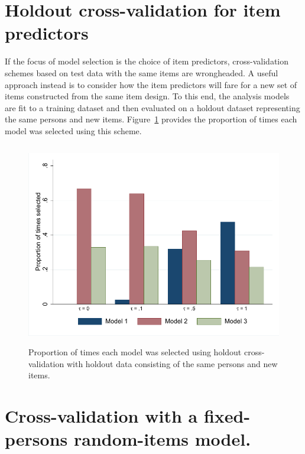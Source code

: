 \documentclass[12pt, letterpaper]{article}
\begin{document}
\section{Holdout cross-validation for item predictors}

If the focus of model selection is the choice of item predictors, cross-validation schemes based on test data with the same items are wrongheaded. A useful approach instead is to consider how the item predictors will fare for a new set of items constructed from the same item design. To this end, the analysis models are fit to a training dataset and then evaluated on a holdout dataset representing the same persons and new items. Figure~\ref{fig:select-newitems} provides the proportion of times each model was selected using this scheme. 

\begin{figure}[tbp]
	\centering
	\includegraphics[height=3.5in, trim = 1mm 1mm 1mm 1mm, clip=true]
		{chapter_2/figs/select_newitems.pdf}
	\caption{Proportion of times each model was selected using holdout cross-validation with holdout data consisting of the same persons and new items.}
	\label{fig:select-newitems}
\end{figure}


\section{Cross-validation with a fixed-persons random-items model.}
\end{document}

